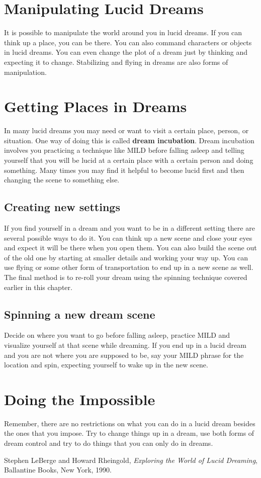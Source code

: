 \documentclass{book}
\begin{document}
\section{Manipulating Lucid Dreams}
It is possible to manipulate the world around you in lucid dreams. If you can think up a place, you can be there. You can also command characters or objects in lucid dreams. You can even change the plot of a dream just by thinking and expecting it to change. Stabilizing and flying in dreams are also forms of manipulation.

\section{Getting Places in Dreams}
In many lucid dreams you may need or want to visit a certain place, person, or situation. One way of doing this is called \textbf{dream incubation}. Dream incubation involves you practicing a technique like MILD before falling asleep and telling yourself that you will be lucid at a certain place with a certain person and doing something. Many times you may find it helpful to become lucid first and then changing the scene to something else.

\subsection{Creating new settings}
If you find yourself in a dream and you want to be in a different setting there are several possible ways to do it. You can think up a new scene and close your eyes and expect it will be there when you open them. You can also build the scene out of the old one by starting at smaller details and working your way up. You can use flying or some other form of transportation to end up in a new scene as well. The final method is to re-roll your dream using the spinning technique covered earlier in this chapter.

\subsection{Spinning a new dream scene}
Decide on where you want to go before falling asleep, practice MILD and visualize yourself at that scene while dreaming. If you end up in a lucid dream and you are not where you are supposed to be, say your MILD phrase for the location and spin, expecting yourself to wake up in the new scene.

\section{Doing the Impossible}
Remember, there are no restrictions on what you can do in a lucid dream besides the ones that you impose. Try to change things up in a dream, use both forms of dream control and try to do things that you can only do in dreams.

\begin{thebibliography}{9}

  Stephen LeBerge and Howard Rheingold,
  \textit{Exploring the World of Lucid Dreaming},
  Ballantine Books, New York,
  1990.

\end{thebibliography}
\end{document}
